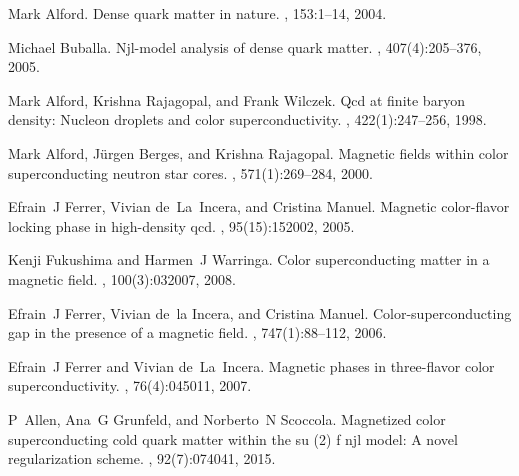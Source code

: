 \documentclass[prd, showpacs,nofootinbib,amsmath,amssymb]{revtex4}
\begin{document}
\begin{thebibliography}{99}

%

Mark Alford.
\newblock Dense quark matter in nature.
, 153:1--14, 2004.

Michael Buballa.
\newblock Njl-model analysis of dense quark matter.
, 407(4):205--376, 2005.

Mark Alford, Krishna Rajagopal, and Frank Wilczek.
\newblock Qcd at finite baryon density: Nucleon droplets and color
  superconductivity.
, 422(1):247--256, 1998.

Mark Alford, J{\"u}rgen Berges, and Krishna Rajagopal.
\newblock Magnetic fields within color superconducting neutron star cores.
, 571(1):269--284, 2000.

Efrain~J Ferrer, Vivian de~La~Incera, and Cristina Manuel.
\newblock Magnetic color-flavor locking phase in high-density qcd.
, 95(15):152002, 2005.

Kenji Fukushima and Harmen~J Warringa.
\newblock Color superconducting matter in a magnetic field.
, 100(3):032007, 2008.

Efrain~J Ferrer, Vivian de~la Incera, and Cristina Manuel.
\newblock Color-superconducting gap in the presence of a magnetic field.
, 747(1):88--112, 2006.

Efrain~J Ferrer and Vivian de~La~Incera.
\newblock Magnetic phases in three-flavor color superconductivity.
, 76(4):045011, 2007.

P~Allen, Ana~G Grunfeld, and Norberto~N Scoccola.
\newblock Magnetized color superconducting cold quark matter within the su (2)
  f njl model: A novel regularization scheme.
, 92(7):074041, 2015.


\end{thebibliography}
\end{document}
